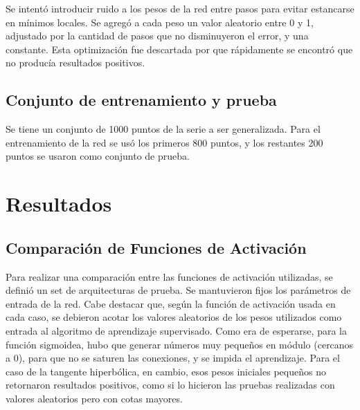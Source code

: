 \documentclass[a4paper,10pt]{article}
\begin{document}
        Se intentó introducir ruido a los pesos de la red entre pasos para evitar estancarse en mínimos locales.
        Se agregó a cada peso un valor aleatorio entre 0 y 1, adjustado por la cantidad de pasos que no disminuyeron el error, y una constante.
        Esta optimización fue descartada por que rápidamente se encontró que no producía resultados positivos.

    \subsection{Conjunto de entrenamiento y prueba}

    Se tiene un conjunto de 1000 puntos de la serie a ser generalizada.
    Para el entrenamiento de la red se usó los primeros 800 puntos, y los restantes 200 puntos se usaron como conjunto de prueba.

\section{Resultados}

    \subsection{Comparación de Funciones de Activación}
    \label{sec:comparacion-activacion}

    Para realizar una comparación entre las funciones de activación utilizadas, se definió un set de arquitecturas de prueba. Se mantuvieron fijos los parámetros de entrada de la red.
    Cabe destacar que, según la función de activación usada en cada caso, se debieron acotar los valores aleatorios de los pesos utilizados como entrada al algoritmo de aprendizaje
    supervisado. Como era de esperarse, para la función sigmoidea, hubo que generar números muy pequeños en módulo (cercanos a 0), para que no se saturen las conexiones, y se impida el aprendizaje.
    Para el caso de la tangente hiperbólica, en cambio, esos pesos  iniciales pequeños no retornaron resultados positivos, como si lo hicieron las pruebas realizadas con valores 
    aleatorios pero con cotas mayores.
\end{document}
